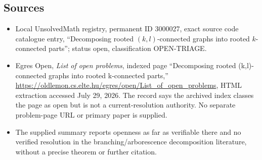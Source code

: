 \documentclass[11pt]{article}
\begin{document}
\subsection{Sources}
\begin{itemize}
\item Local UnsolvedMath registry, permanent ID 3000027, exact source code catalogue entry, ``Decomposing rooted $(k,l)$-connected graphs into rooted $k$-connected parts''; status open, classification OPEN-TRIAGE.
\item Egres Open, \emph{List of open problems}, indexed page ``Decomposing rooted (k,l)-connected graphs into rooted k-connected parts,'' \url{https://oldlemon.cs.elte.hu/egres/open/List_of_open_problems}, HTML extraction accessed July 29, 2026. The record says the archived index classes the page as open but is not a current-resolution authority. No separate problem-page URL or primary paper is supplied.
\item The supplied summary reports openness as far as verifiable there and no verified resolution in the branching/arborescence decomposition literature, without a precise theorem or further citation.
\end{itemize}
\end{document}
